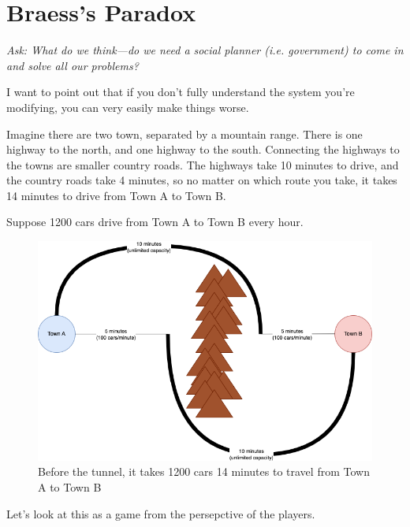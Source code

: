\documentclass[11pt]{article}
\begin{document}
\section{Braess's Paradox}

{\it Ask: What do we think---do we need a social planner (i.e. government) to come in and solve all our problems?}

I want to point out that if you don't fully understand the system you're modifying, you can very easily make things worse. 

Imagine there are two town, separated by a mountain range. There is one highway to the north, and one highway to the south. 
Connecting the highways to the towns are smaller country roads.  
The highways take 10 minutes to drive, and the country roads take 4 minutes, so no matter on which route you take, it takes 14 minutes to drive from Town A to Town B.

Suppose 1200 cars drive from Town A to Town B every hour. 

\begin{figure}
    \centering
    \includegraphics[width=5in]{braess_1.png}
    \caption{Before the tunnel, it takes 1200 cars 14 minutes to travel from Town A to Town B}
\end{figure}


Let's look at this as a game from the persepctive of the players. 
\end{document}
